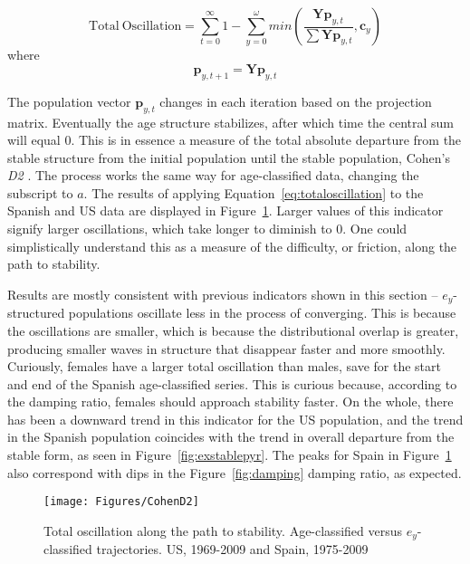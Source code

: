 \begin{equation}
\label{eq:totaloscillation}
\mathrm{Total~Oscillation} = \sum _{t=0} ^\infty 1 - \sum _{y=0} ^\omega
min \left( \frac{\boldsymbol{Y} \boldsymbol{p}_{y,t}}{\sum \boldsymbol{Y}
\boldsymbol{p}_{y,t}}, \boldsymbol{c}_y \right)
\end{equation}
where
\begin{equation}
\boldsymbol{p}_{y,t+1} = \boldsymbol{Y} \boldsymbol{p}_{y,t}
\end{equation}

The population vector $\textbf{p}_{y,t}$ changes in each iteration based on the
projection matrix. Eventually the age structure stabilizes, after which time the central sum will
equal 0. This is in essence a measure of the total absolute departure from the
stable structure from the initial population until the stable population,
Cohen's \textit{D2} \citep{caswell2001matrix}. The process works the same way
for age-classified data, changing the subscript to $a$. The results of applying
Equation~\eqref{eq:totaloscillation} to the Spanish and US data are displayed
in Figure~\ref{fig:exCohenD2}. Larger values of this indicator signify larger
oscillations, which take longer to diminish to 0. One could
simplistically understand this as a measure of the difficulty, or friction,
along the path to stability.

Results are mostly consistent with previous indicators shown in this section --
$e_y$-structured populations oscillate less in the process of converging. This
is because the oscillations are smaller, which is because the distributional
overlap is greater, producing smaller waves in structure that disappear faster
and more smoothly. Curiously, females have a larger total oscillation than
males, save for the start and end of the Spanish age-classified series. This is
curious because, according to the damping ratio, females should approach
stability faster. On the whole, there has been a downward trend in this
indicator for the US population, and the trend in the Spanish population
coincides with the trend in overall departure from the stable form, as seen in
Figure~\ref{fig:exstablepyr}. The peaks for Spain in Figure~\ref{fig:exCohenD2}
also correspond with dips in the Figure~\ref{fig:damping} damping ratio, as
expected.

\begin{figure}[ht!]
       \centering
       \caption{Total oscillation along the path to
       stability. Age-classified versus $e_y$-classified trajectories. US,
       1969-2009 and Spain, 1975-2009}
        \texttt{[image: Figures/CohenD2]}
        \label{fig:exCohenD2}
\end{figure}

